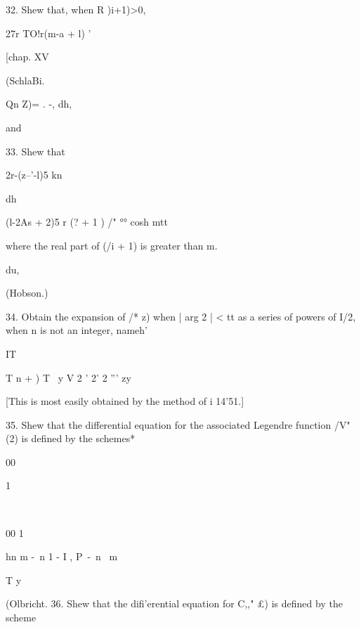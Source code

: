{{{{32. Shew that, when R )i+1)>0, 



27r TO!r(m-a + l)  ' 



[chap. XV 



(SchlaBi. 



Qn  Z)= . -, dh, 



and 



33. Shew that 




 2r-(z--'-l)5 kn 



dh 



(l-2As +  2)5 
r (?  + 1 ) /" °° cosh mtt 






where the real part of (/i + 1) is greater than m. 



du, 



(Hobson.) 



34. Obtain the expansion of /*   z) when | arg 2 | < tt as a series of powers of I/2, when 
n is not an integer, nameh' 

IT 

T n +  ) T \ y V 2 ' 2' 2 ''' zy 

[This is most easily obtained by the method of i  14'51.] 

35. Shew that the differential equation for the associated Legendre function /V" (2) 
is defined by the schemes* 



00 



1 



\ 



00 1 



hn m -\ n    1 - I , P\ -\ n \ m ~ 



T y 



(Olbricht. 
36. Shew that the difi'erential equation for C,,"  £) is defined by the scheme 



}}}}
